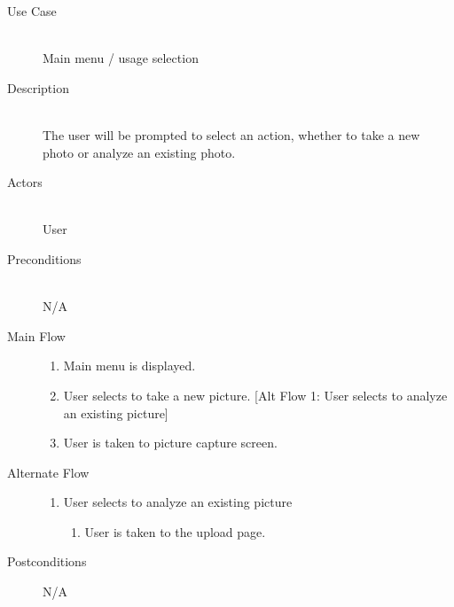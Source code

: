 \begin{description}
    \item[Use Case] \hfill \\
        Main menu / usage selection
    \item[Description] \hfill \\
        The user will be prompted to select an action, whether to take a new photo or analyze an existing photo.
    \item[Actors] \hfill \\
        User
    \item[Preconditions] \hfill \\
            N/A
    \item[Main Flow] \hfill 
        \begin{enumerate}
            \item Main menu is displayed.
            \item User selects to take a new picture.
                [Alt Flow 1: User selects to analyze an existing picture]
            \item User is taken to picture capture screen.
        \end{enumerate}
    \item[Alternate Flow] \hfill 
        \begin{enumerate}
            \item User selects to analyze an existing picture
                \begin{enumerate}
                    \item User is taken to the upload page.
                \end{enumerate}
        \end{enumerate}
    \item[Postconditions]
        N/A
\end{description}

